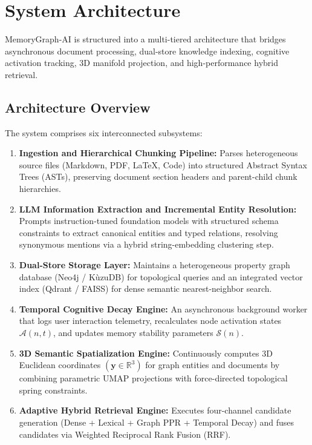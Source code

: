 \section{System Architecture}
\label{sec:architecture}

MemoryGraph-AI is structured into a multi-tiered architecture that bridges asynchronous document processing, dual-store knowledge indexing, cognitive activation tracking, 3D manifold projection, and high-performance hybrid retrieval.

\subsection{Architecture Overview}
The system comprises six interconnected subsystems:
\begin{enumerate}
    \item \textbf{Ingestion and Hierarchical Chunking Pipeline:} Parses heterogeneous source files (Markdown, PDF, LaTeX, Code) into structured Abstract Syntax Trees (ASTs), preserving document section headers and parent-child chunk hierarchies.
    \item \textbf{LLM Information Extraction and Incremental Entity Resolution:} Prompts instruction-tuned foundation models with structured schema constraints to extract canonical entities and typed relations, resolving synonymous mentions via a hybrid string-embedding clustering step.
    \item \textbf{Dual-Store Storage Layer:} Maintains a heterogeneous property graph database (Neo4j / K\`uzuDB) for topological queries and an integrated vector index (Qdrant / FAISS) for dense semantic nearest-neighbor search.
    \item \textbf{Temporal Cognitive Decay Engine:} An asynchronous background worker that logs user interaction telemetry, recalculates node activation states $\mathcal{A}(n, t)$, and updates memory stability parameters $\mathcal{S}(n)$.
    \item \textbf{3D Semantic Spatialization Engine:} Continuously computes 3D Euclidean coordinates $(\mathbf{y} \in \mathbb{R}^3)$ for graph entities and documents by combining parametric UMAP projections with force-directed topological spring constraints.
    \item \textbf{Adaptive Hybrid Retrieval Engine:} Executes four-channel candidate generation (Dense + Lexical + Graph PPR + Temporal Decay) and fuses candidates via Weighted Reciprocal Rank Fusion (RRF).
\end{enumerate}

